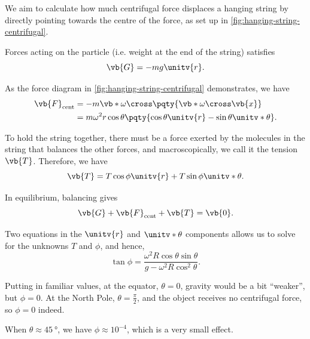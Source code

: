 \begin{example}
    \label{ex:hanging-string}%
    We aim to calculate how much centrifugal force displaces a hanging string by directly pointing towards the centre of the force, as set up in \autoref{fig:hanging-string-centrifugal}.

    Forces acting on the particle (i.e. weight at the end of the string) satisfies
    \begin{equation}
        \vb{G} = - m g \unitv{r}.
    \end{equation}

    As the force diagram in \autoref{fig:hanging-string-centrifugal} demonstrates, we have
    \begin{subequations}\begin{align}
        \vb{F}_{\text{cent}} &= - m \vb*{\omega} \cross \pqty{\vb*{\omega} \cross \vb{x}} \\
        &= m \omega^2 r \cos \theta \pqty{\cos \theta \unitv{r} - \sin \theta \unitv*{\theta}}.
    \end{align}\end{subequations}

    To hold the string together, there must be a force exerted by the molecules in the string that balances the other forces, and macroscopically, we call it the tension \(\vb{T}\). Therefore, we have
    \begin{equation}
        \vb{T} = T \cos \phi \unitv{r} + T \sin \phi \unitv*{\theta}.
    \end{equation}

    In equilibrium, balancing gives
    \begin{equation}
        \vb{G} + \vb{F}_{\text{cent}} + \vb{T} = \vb{0}.
    \end{equation}

    Two equations in the \(\unitv{r}\) and \(\unitv*{\theta}\) components allows us to solve for the unknowns \(T\) and \(\phi\), and hence,
    \begin{equation}
        \tan \phi = \frac{\omega^2 R \cos \theta \sin \theta}{g - \omega^2 R \cos^2 \theta}.
    \end{equation}

    Putting in familiar values, at the equator, \(\theta = 0\), gravity would be a bit ``weaker'', but \(\phi = 0\). At the North Pole, \(\theta = \frac{\pi}{2}\), and the object receives no centrifugal force, so \(\phi = 0\) indeed.

    When \(\theta \approx \SI{45}{\degree}\), we have \(\phi \approx 10^{-4}\), which is a very small effect.
\end{example}

